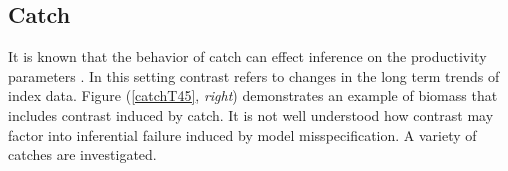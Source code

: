 \documentclass[12pt]{article}
\begin{document}



%




%


%
\subsection{Catch \label{catch}}	


%
It is known that the behavior of catch can effect inference on the productivity %
parameters . %
In this setting contrast refers to changes in the long term trends of index data. 
Figure (\ref{catchT45}, \emph{right}) demonstrates an example of biomass 
that includes contrast induced by catch. It 
is not well understood how contrast may factor into inferential failure induced by model %
misspecification. A variety of catches are investigated.
\end{document}
